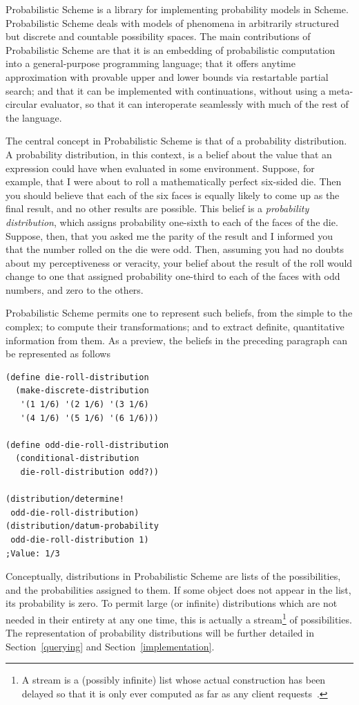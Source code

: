 \documentclass[10pt]{sigplanconf}
\newcommand{\defn}[1]{\textit{#1}}
\begin{document}
Probabilistic Scheme is a library for implementing probability models
in Scheme.  Probabilistic Scheme deals with models of phenomena in
arbitrarily structured but discrete and countable possibility spaces.
The main contributions of Probabilistic Scheme are that it is an 
embedding of probabilistic computation into a general-purpose
programming language; that it offers anytime approximation with
provable upper and lower bounds via restartable partial search; and
that it can be implemented with continuations, without using a
meta-circular evaluator, so that it can interoperate seamlessly
with much of the rest of the language.

The central concept in Probabilistic Scheme is
that of a probability distribution.  A
probability distribution, in this context, is a belief about the value
that an expression could have when evaluated in some environment.
Suppose, for example, that I were about to roll a mathematically
perfect six-sided die.  Then you should believe that each of the six
faces is equally likely to come up as the final result, and no other
results are possible.  This belief is a \defn{probability
distribution}, which assigns probability one-sixth to each of the
faces of the die.  Suppose, then, that you asked me the parity of the
result and I informed you that the number rolled on the die were odd.
Then, assuming you had no doubts about my perceptiveness or veracity,
your belief about the result of the roll would change to one that
assigned probability one-third to each of the faces with odd numbers,
and zero to the others.

Probabilistic Scheme permits one to represent
such beliefs, from the simple to the complex; to compute their
transformations; and to extract definite, quantitative information
from them.  As a preview, the beliefs in the preceding paragraph can
be represented as follows
\begin{verbatim}
(define die-roll-distribution
  (make-discrete-distribution
   '(1 1/6) '(2 1/6) '(3 1/6)
   '(4 1/6) '(5 1/6) '(6 1/6)))

(define odd-die-roll-distribution
  (conditional-distribution
   die-roll-distribution odd?))

(distribution/determine!
 odd-die-roll-distribution)
(distribution/datum-probability
 odd-die-roll-distribution 1)
;Value: 1/3
\end{verbatim}

Conceptually, distributions in Probabilistic Scheme are lists of the
possibilities, and the probabilities assigned to them.  If some object
does not appear in the list, its probability is zero.  To permit large
(or infinite) distributions which are not needed in their entirety at
any one time, this is actually a stream\footnote{A stream is a
(possibly infinite) list whose actual construction has been delayed so
that it is only ever computed as far as any client requests~\cite{sicp}.} of
possibilities.  The representation of probability distributions will be
further detailed in Section~\ref{querying} and
Section~\ref{implementation}.
\end{document}
